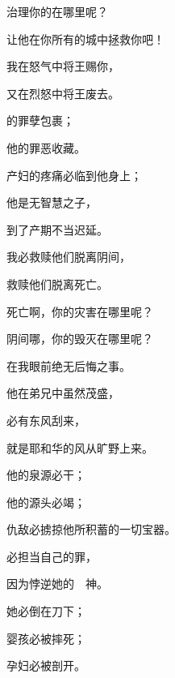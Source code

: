 {\par }{\Q 治理你的在哪里呢？
\par }{\Q 让他在你所有的城中拯救你吧！
\par }{\Q {}我在怒气中将王赐你，
\par }{\Q 又在烈怒中将王废去。
\par }{\BB \par }{\Q {}的罪孽包裹；
\par }{\Q 他的罪恶收藏。
\par }{\Q {}产妇的疼痛必临到他身上；
\par }{\Q 他是无智慧之子，
\par }{\Q 到了产期不当迟延。
\par }{\Q {}我必救赎他们脱离阴间，
\par }{\Q 救赎他们脱离死亡。
\par }{\Q 死亡啊，你的灾害在哪里呢？
\par }{\Q 阴间哪，你的毁灭在哪里呢？
\par }{\Q 在我眼前绝无后悔之事。
\par }{\Q {}他在弟兄中虽然茂盛，
\par }{\Q 必有东风刮来，
\par }{\Q 就是耶和华的风从旷野上来。
\par }{\Q 他的泉源必干；
\par }{\Q 他的源头必竭；
\par }{\Q 仇敌必掳掠他所积蓄的一切宝器。
\par }{\Q {}必担当自己的罪，
\par }{\Q 因为悖逆她的　神。
\par }{\Q 她必倒在刀下；
\par }{\Q 婴孩必被摔死；
\par }{\Q 孕妇必被剖开。

}
